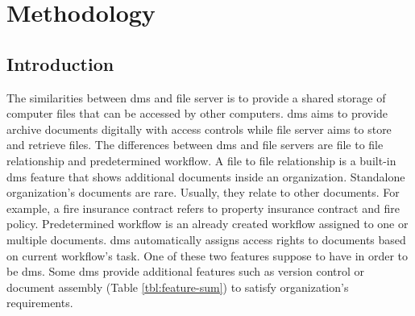 \chapter{Methodology}
\section{Introduction}
The similarities between \gls{dms} and file server is to provide a shared storage of computer files that can be accessed by other computers.
\gls{dms} aims to provide archive documents digitally with access controls while file server aims to store and retrieve files.
The differences between \gls{dms} and file servers are file to file relationship and predetermined workflow.
A file to file relationship is a built-in \gls{dms} feature that shows additional documents inside an organization.
Standalone organization's documents are rare.
Usually, they relate to other documents.
For example, a fire insurance contract refers to property insurance contract and fire policy.
Predetermined workflow is an already created workflow assigned to one or multiple documents.
\gls{dms} automatically assigns access rights to documents based on current workflow's task.
One of these two features suppose to have in order to be \gls{dms}.
Some \gls{dms} provide additional features such as version control or document assembly (Table \ref{tbl:feature-sum}) to satisfy organization's requirements.
